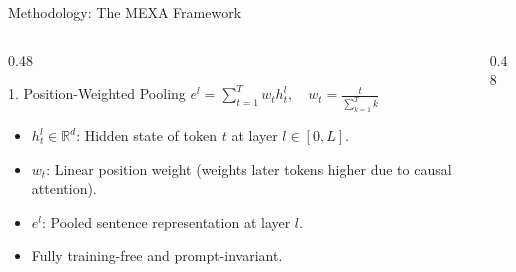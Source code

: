 \documentclass[
  english,
  aspectratio=169,
]{tumbeamer}
\begin{document}
\begin{frame}{Methodology: The MEXA Framework}
  \begin{columns}[T]
    \begin{column}{0.48\textwidth}
      \begin{block}{1. Position-Weighted Pooling}
        \centering
        \vspace{0.1em}
        {\small $\displaystyle e^l = \sum_{t=1}^T w_t h_t^l, \quad w_t = \frac{t}{\sum_{k=1}^T k}$}
        \vspace{0.1em}
      \end{block}
      \vspace{0.1em}
      \begin{itemize}\scriptsize \setlength{\itemsep}{1.5pt}
        \item $h_t^l \in \mathbb{R}^d$: Hidden state of token $t$ at layer $l \in [0, L]$.
        \item $w_t$: Linear position weight (weights later tokens higher due to causal attention).
        \item $e^l$: Pooled sentence representation at layer $l$.
        \item Fully training-free and prompt-invariant.
      \end{itemize}
    \end{column}
    \begin{column}{0.48\textwidth}
\end{column}
\end{columns}
\end{frame}
\end{document}
